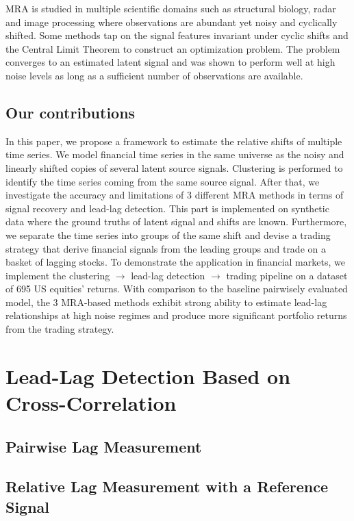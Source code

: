 \documentclass[sigconf]{acmart}
\begin{document}
MRA is studied in multiple scientific domains such as structural biology, radar and image processing where observations are abundant yet noisy and cyclically shifted. Some methods tap on the signal features invariant under cyclic shifts and the Central Limit Theorem to construct an optimization problem\cite{Boumal2017Oct}. The problem converges to an estimated latent signal and was shown to perform well at high noise levels as long as a sufficient number of observations are available. 

\subsection{Our contributions}
    
In this paper, we propose a framework to estimate the relative shifts of multiple time series. We model financial time series in the same universe as the noisy and linearly shifted copies of several latent source signals. Clustering is performed to identify the time series coming from the same source signal. After that, we investigate the accuracy and limitations of 3 different MRA methods in terms of signal recovery and lead-lag detection. This part is implemented on synthetic data where the ground truths of latent signal and shifts are known. Furthermore, we separate the time series into groups of the same shift and devise a trading strategy that derive financial signals from the leading groups and trade on a basket of lagging stocks. To demonstrate the application in financial markets, we implement the clustering $\rightarrow$ lead-lag detection $\rightarrow$ trading pipeline on a dataset of 695 US equities' returns. With comparison to the baseline pairwisely evaluated model, the 3 MRA-based methods exhibit strong ability to estimate lead-lag relationships at high noise regimes and produce more significant portfolio returns from the trading strategy.

\section{Lead-Lag Detection Based on Cross-Correlation}
\subsection{Pairwise Lag Measurement}
\subsection{Relative Lag Measurement with a Reference Signal}
\end{document}
